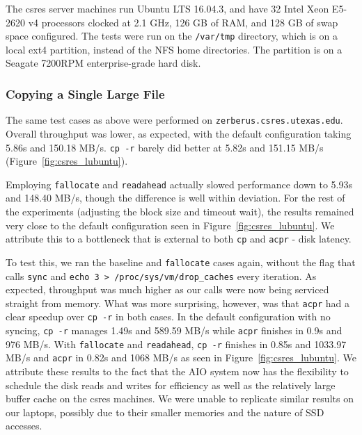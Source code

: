 \documentclass[11pt]{article}
\begin{document}
The csres server machines run Ubuntu LTS 16.04.3, and have 32 Intel Xeon E5-2620
v4 processors clocked at 2.1 GHz, 126 GB of RAM, and 128 GB of swap space
configured. The tests were run on the \texttt{/var/tmp} directory, which is on a
local ext4 partition, instead of the NFS home directories. The partition is on a
Seagate 7200RPM enterprise-grade hard disk.

\subsubsection{Copying a Single Large File} \label{ssubsec:csres_large}

The same test cases as above were performed on
\texttt{zerberus.csres.utexas.edu}. Overall throughput was lower, as expected,
with the default configuration taking 5.86s and 150.18 MB/s. \texttt{cp -r}
barely did better at 5.82s and 151.15 MB/s (Figure~\ref{fig:csres_lubuntu}).

Employing \texttt{fallocate} and \texttt{readahead} actually slowed performance
down to 5.93s and 148.40 MB/s, though the difference is well within deviation.
For the rest of the experiments (adjusting the block size and timeout wait), the
results remained very close to the default configuration seen in
Figure~\ref{fig:csres_lubuntu}. We attribute this to a bottleneck that is
external to both \texttt{cp} and \texttt{acpr} - disk latency. 

To test this, we ran the baseline and \texttt{fallocate} cases again, without
the flag that calls \texttt{sync} and \texttt{echo 3 >
/proc/sys/vm/drop\_caches} every iteration. As expected, throughput was much
higher as our calls were now being serviced straight from memory. What was more
surprising, however, was that \texttt{acpr} had a clear speedup over \texttt{cp
-r} in both cases. In the default configuration with no syncing, \texttt{cp -r}
manages 1.49s and 589.59 MB/s while \texttt{acpr} finishes in 0.9s and 976 MB/s.
With \texttt{fallocate} and \texttt{readahead}, \texttt{cp -r} finishes in 0.85s
and 1033.97 MB/s and \texttt{acpr} in 0.82s and 1068 MB/s as seen in
Figure~\ref{fig:csres_lubuntu}. We attribute these results to the fact that the
AIO system now has the flexibility to schedule the disk reads and writes for
efficiency as well as the relatively large buffer cache on the csres machines.
We were unable to replicate similar results on our laptops, possibly due to
their smaller memories and the nature of SSD accesses.
\end{document}
